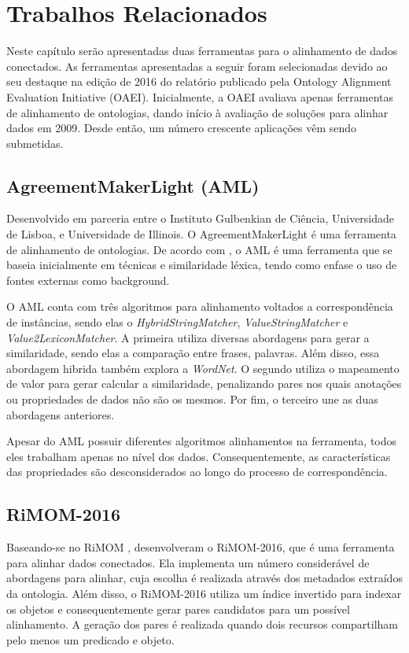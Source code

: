 \chapter{Trabalhos Relacionados}
\label{cap:relacionados}
Neste capítulo serão apresentadas duas ferramentas para o alinhamento de dados conectados. As ferramentas apresentadas a seguir foram selecionadas devido ao seu destaque na edição de 2016 do relatório publicado pela Ontology Alignment Evaluation Initiative (OAEI). Inicialmente, a OAEI avaliava apenas ferramentas de alinhamento de ontologias, dando início à avaliação de soluções para alinhar dados em 2009. Desde então, um número crescente aplicações vêm sendo submetidas.

\section{AgreementMakerLight (AML)}
Desenvolvido em parceria entre o Instituto Gulbenkian de Ciência, Universidade de Lisboa, e Universidade de Illinois. O AgreementMakerLight é uma ferramenta de alinhamento de ontologias. De acordo com \cite{fariaoaei}, o AML é uma ferramenta que se baseia inicialmente em técnicas e similaridade léxica, tendo como enfase o uso de fontes externas como background.

O AML conta com três algoritmos para alinhamento voltados a correspondência de instâncias, sendo elas o \textit{HybridStringMatcher}, \textit{ValueStringMatcher} e \textit{Value2LexiconMatcher}. A primeira utiliza diversas abordagens para gerar a similaridade, sendo elas a comparação entre frases, palavras. Além disso, essa abordagem hibrida também explora a \textit{WordNet}. O segundo utiliza o mapeamento de valor para gerar calcular a similaridade, penalizando pares nos quais anotações ou propriedades de dados não são os mesmos. Por fim, o terceiro une as duas abordagens anteriores.

Apesar do AML possuir diferentes algoritmos alinhamentos na ferramenta, todos eles trabalham apenas no nível dos dados. Consequentemente, as características das propriedades são desconsiderados ao longo do processo de correspondência.

\section{RiMOM-2016}
Baseando-se no RiMOM  \cite{li2009rimom}, \cite{zhang2016rimom} desenvolveram o RiMOM-2016, que é uma ferramenta para alinhar dados conectados. Ela implementa um número considerável de abordagens para alinhar, cuja escolha é realizada através dos metadados extraídos da ontologia. Além disso, o RiMOM-2016 utiliza um índice invertido para indexar os objetos e consequentemente gerar pares candidatos para um possível alinhamento. A geração dos pares é realizada quando dois recursos compartilham pelo menos um predicado e objeto.

